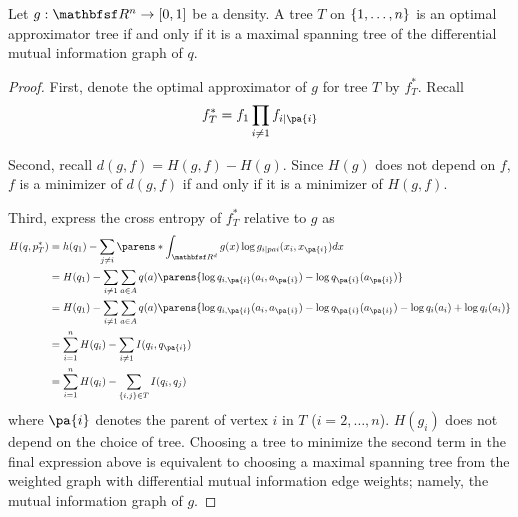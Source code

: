 \begin{prop}

Let $g: \R^n \to [0, 1]$ be a density.
A tree $T$ on $\{1, \dots, n\}$ is an optimal approximator tree if and only if it is a maximal spanning tree of the differential mutual information graph of $q$.

\begin{proof}
First, denote the optimal approximator of $g$ for tree $T$ by $f^*_T$. Recall
$$
  f^*_T = f_1 \prod_{i \neq 1} f_{i \mid \pa{i}}
$$

Second, recall $d(g, f) = H(g, f) - H(g)$.
Since $H(g)$ does not depend on $f$, $f$ is a minimizer of $d(g, f)$ if and only if it is a minimizer of $H(g, f)$.

Third, express the cross entropy of $f^*_T$ relative to $g$ as
$$
\begin{aligned}
  H(q, p^*_T) &= h(q_1) - \sum_{j \neq i} \parens*{ \int_{\R^d} g(x) \log g_{i \mid pa{i}}(x_i, x_{\pa{i}}) dx } \\
              &= H(q_1) - \sum_{i \neq 1} \sum_{a \in A} q(a)\parens{\log q_{i,\pa{i}}(a_i, a_{\pa{i}}) - \log q_{\pa{i}}(a_{\pa{i}})} \\
              &= H(q_1) - \sum_{i \neq 1} \sum_{a \in A} q(a)\parens{\log q_{i,\pa{i}}(a_i, a_{\pa{i}}) - \log q_{\pa{i}}(a_{\pa{i}}) - \log q_i(a_i)  + \log q_{i}(a_i)} \\
              &= \sum_{i = 1}^{n} H(q_i) - \sum_{i \neq 1} I(q_i, q_{\pa{i}}) \\
              &= \sum_{i = 1}^{n} H(q_i) - \sum_{\set{i,j} \in T} I(q_i, q_{j}) \\
\end{aligned}
$$
where $\pa{i}$ denotes the parent of vertex $i$ in $T$ ($i = 2, \dots, n$).
$H(g_i)$ does not depend on the choice of tree.
Choosing a tree to minimize the second term in the final expression above is equivalent to choosing a maximal spanning tree from the weighted graph with differential mutual information edge weights; namely, the mutual information graph of $g$.

\end{proof}

\end{prop}
\strats
